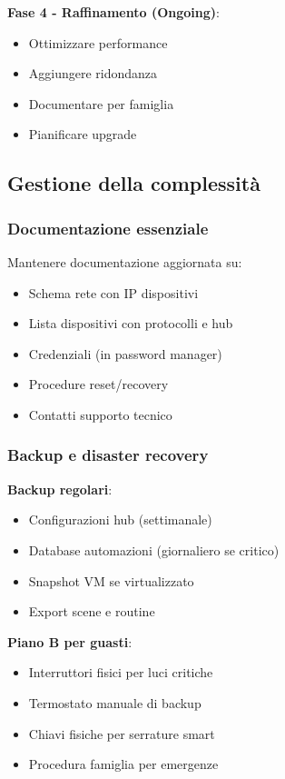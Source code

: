 \textbf{Fase 4 - Raffinamento (Ongoing)}:
\begin{itemize}
    \item Ottimizzare performance
    \item Aggiungere ridondanza
    \item Documentare per famiglia
    \item Pianificare upgrade
\end{itemize}

\subsection{Gestione della complessità}

\subsubsection{Documentazione essenziale}

Mantenere documentazione aggiornata su:
\begin{itemize}
    \item Schema rete con IP dispositivi
    \item Lista dispositivi con protocolli e hub
    \item Credenziali (in password manager)
    \item Procedure reset/recovery
    \item Contatti supporto tecnico
\end{itemize}

\subsubsection{Backup e disaster recovery}

\textbf{Backup regolari}:
\begin{itemize}
    \item Configurazioni hub (settimanale)
    \item Database automazioni (giornaliero se critico)
    \item Snapshot VM se virtualizzato
    \item Export scene e routine
\end{itemize}

\textbf{Piano B per guasti}:
\begin{itemize}
    \item Interruttori fisici per luci critiche
    \item Termostato manuale di backup
    \item Chiavi fisiche per serrature smart
    \item Procedura famiglia per emergenze
\end{itemize}

